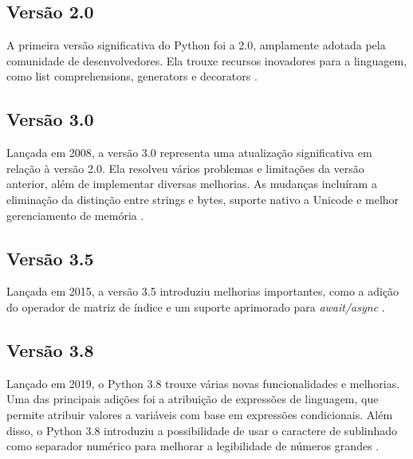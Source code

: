\subsection{Versão 2.0}
A primeira versão significativa do Python foi a 2.0, amplamente adotada pela comunidade de desenvolvedores. Ela trouxe recursos inovadores para a linguagem, como list comprehensions, generators e decorators \cite{awari_python_version}.

\subsection{Versão 3.0}
Lançada em 2008, a versão 3.0 representa uma atualização significativa em relação à versão 2.0. Ela resolveu vários problemas e limitações da versão anterior, além de implementar diversas melhorias. As mudanças incluíram a eliminação da distinção entre strings e bytes, suporte nativo a Unicode e melhor gerenciamento de memória \cite{awari_python_version}.

\subsection{Versão 3.5}
Lançada em 2015, a versão 3.5 introduziu melhorias importantes, como a adição do operador de matriz de índice e um suporte aprimorado para \textit{await/async} \cite{awari_python_version}.

\subsection{Versão 3.8}
Lançado em 2019, o Python 3.8 trouxe várias novas funcionalidades e melhorias. Uma das principais adições foi a atribuição de expressões de linguagem, que permite atribuir valores a variáveis com base em expressões condicionais. Além disso, o Python 3.8 introduziu a possibilidade de usar o caractere de sublinhado como separador numérico para melhorar a legibilidade de números grandes \cite{awari_python_version}.